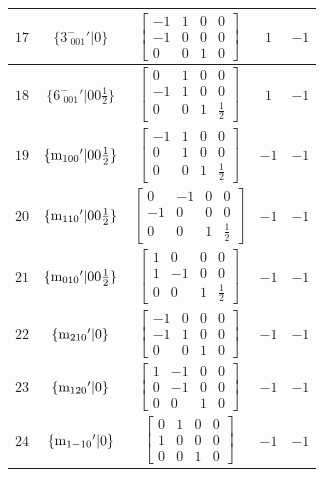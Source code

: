 \documentclass[fleqn,8pt]{jsarticle}
\begin{document}
\begin{longtable}{ccccc}
$ 17 $ & $ \{3^{-}_{\,\,001}{}'|0\} $ & $ \begin{bmatrix} -1 & 1 & 0 & 0 \\ -1 & 0 & 0 & 0 \\ 0 & 0 & 1 & 0 \end{bmatrix} $ & $ 1 $ & $ -1 $ \\ \hline
$ 18 $ & $ \{6^{-}_{\,\,001}{}'|0 0 \frac{1}{2}\} $ & $ \begin{bmatrix} 0 & 1 & 0 & 0 \\ -1 & 1 & 0 & 0 \\ 0 & 0 & 1 & \frac{1}{2} \end{bmatrix} $ & $ 1 $ & $ -1 $ \\ \hline
$ 19 $ & $ \{{\rm m}_{100}{}'|0 0 \frac{1}{2}\} $ & $ \begin{bmatrix} -1 & 1 & 0 & 0 \\ 0 & 1 & 0 & 0 \\ 0 & 0 & 1 & \frac{1}{2} \end{bmatrix} $ & $ -1 $ & $ -1 $ \\ \hline
$ 20 $ & $ \{{\rm m}_{110}{}'|0 0 \frac{1}{2}\} $ & $ \begin{bmatrix} 0 & -1 & 0 & 0 \\ -1 & 0 & 0 & 0 \\ 0 & 0 & 1 & \frac{1}{2} \end{bmatrix} $ & $ -1 $ & $ -1 $ \\ \hline
$ 21 $ & $ \{{\rm m}_{010}{}'|0 0 \frac{1}{2}\} $ & $ \begin{bmatrix} 1 & 0 & 0 & 0 \\ 1 & -1 & 0 & 0 \\ 0 & 0 & 1 & \frac{1}{2} \end{bmatrix} $ & $ -1 $ & $ -1 $ \\ \hline
$ 22 $ & $ \{{\rm m}_{210}{}'|0\} $ & $ \begin{bmatrix} -1 & 0 & 0 & 0 \\ -1 & 1 & 0 & 0 \\ 0 & 0 & 1 & 0 \end{bmatrix} $ & $ -1 $ & $ -1 $ \\ \hline
$ 23 $ & $ \{{\rm m}_{120}{}'|0\} $ & $ \begin{bmatrix} 1 & -1 & 0 & 0 \\ 0 & -1 & 0 & 0 \\ 0 & 0 & 1 & 0 \end{bmatrix} $ & $ -1 $ & $ -1 $ \\ \hline
$ 24 $ & $ \{{\rm m}_{1-10}{}'|0\} $ & $ \begin{bmatrix} 0 & 1 & 0 & 0 \\ 1 & 0 & 0 & 0 \\ 0 & 0 & 1 & 0 \end{bmatrix} $ & $ -1 $ & $ -1 $ \\
\end{longtable}
\end{document}
